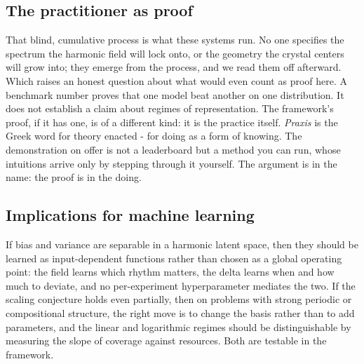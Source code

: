 \subsection{The practitioner as proof}
\label{sec:proof}

That blind, cumulative process is what these systems run. No one specifies the spectrum the harmonic field will lock onto, or the geometry the crystal centers will grow into; they emerge from the process, and we read them off afterward. Which raises an honest question about what would even count as proof here. A benchmark number proves that one model beat another on one distribution. It does not establish a claim about regimes of representation. The framework's proof, if it has one, is of a different kind: it is the practice itself. \textit{Praxis} is the Greek word for theory enacted - for doing as a form of knowing. The demonstration on offer is not a leaderboard but a method you can run, whose intuitions arrive only by stepping through it yourself. The argument is in the name: the proof is in the doing.

\paperGeometryFigure

\subsection{Implications for machine learning}

If bias and variance are separable in a harmonic latent space, then they should be learned as input-dependent functions rather than chosen as a global operating point: the field learns which rhythm matters, the delta learns when and how much to deviate, and no per-experiment hyperparameter mediates the two. If the scaling conjecture holds even partially, then on problems with strong periodic or compositional structure, the right move is to change the basis rather than to add parameters, and the linear and logarithmic regimes should be distinguishable by measuring the slope of coverage against resources. Both are testable in the framework.

\paperFramingDiscussion

\paperConjectures

